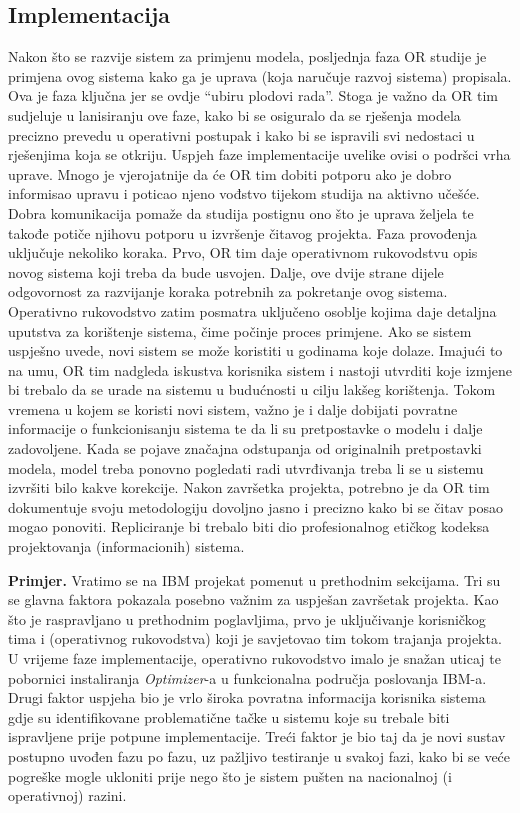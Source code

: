 \documentclass[a4paper, utf8, 11pt, colorlinks]{article}
\begin{document}
\subsection{Implementacija}
Nakon što se razvije sistem za primjenu modela, posljednja faza OR studije je primjena ovog sistema kako ga je uprava (koja naručuje razvoj sistema) propisala. Ova je faza ključna jer se ovdje ``ubiru plodovi rada''. Stoga je važno da OR tim  sudjeluje u  lanisiranju ove faze, kako bi se osiguralo da se rješenja modela precizno prevedu u operativni postupak i kako bi se ispravili svi nedostaci u rješenjima koja se otkriju. Uspjeh faze implementacije uvelike ovisi o podršci vrha uprave. Mnogo je vjerojatnije da će OR tim dobiti potporu ako je dobro informisao upravu i poticao  njeno vođstvo tijekom studija na aktivno učešće. Dobra komunikacija pomaže da studija postignu ono što je uprava željela te takođe potiče njihovu potporu u izvršenje čitavog projekta.  Faza provođenja uključuje nekoliko koraka. Prvo, OR tim daje operativnom rukovodstvu opis novog sistema koji treba da bude usvojen. Dalje, ove dvije strane dijele odgovornost za razvijanje koraka potrebnih za pokretanje ovog sistema. Operativno rukovodstvo zatim posmatra uključeno osoblje kojima daje detaljna uputstva za korištenje sistema, čime počinje proces primjene. Ako se sistem uspješno uvede, novi sistem se može koristiti u godinama koje dolaze. Imajući to na umu, OR tim nadgleda iskustva korisnika sistem i nastoji utvrditi koje izmjene bi trebalo da se urade na sistemu u budućnosti u cilju lakšeg korištenja.  Tokom vremena u kojem se koristi novi sistem, važno je i dalje dobijati povratne informacije o funkcionisanju sistema te da li su pretpostavke o modelu i dalje zadovoljene. Kada se pojave značajna odstupanja od originalnih pretpostavki modela, model treba ponovno pogledati radi utvrđivanja treba li se u sistemu izvršiti bilo kakve korekcije. Nakon završetka projekta, potrebno je da OR tim dokumentuje svoju metodologiju dovoljno jasno i precizno kako bi se čitav posao mogao ponoviti. Repliciranje bi trebalo
biti dio profesionalnog etičkog kodeksa projektovanja (informacionih) sistema. %

\textbf{Primjer.} Vratimo se na   IBM projekat pomenut u prethodnim sekcijama.  Tri su se glavna faktora pokazala posebno važnim za uspješan završetak projekta. Kao što je raspravljano u prethodnim poglavljima, 
prvo je   uključivanje korisničkog tima i (operativnog rukovodstva) koji je savjetovao tim tokom trajanja   projekta. U vrijeme faze implementacije, operativno rukovodstvo imalo je snažan  uticaj te pobornici instaliranja \emph{Optimizer}-a u  funkcionalna područja poslovanja IBM-a. Drugi faktor uspjeha bio je vrlo široka povratna informacija korisnika sistema gdje su identifikovane problematične tačke u sistemu koje su  trebale biti ispravljene prije potpune implementacije. 
Treći faktor je bio taj da je novi sustav postupno uvođen fazu po fazu, uz pažljivo testiranje u svakoj fazi, kako bi se veće pogreške mogle ukloniti prije nego što je sistem   pušten na  nacionalnoj (i operativnoj) razini.  
\vspace{0.5cm}
\end{document}
